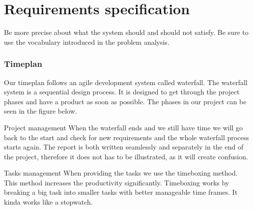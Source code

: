 \chapter{Requirements specification}

Be more precise about what the system should and should not satisfy.
Be sure to use the vocabulary introduced in the problem analysis.


\subsection{Timeplan}
Our timeplan follows an agile development system called waterfall.
The waterfall system is a sequential design process.
It is designed to get through the project phases and have a product as soon as
possible. The phases in our project can be seen in the figure below.

Project management
When the waterfall ends and we still have time
we will go back to the start and check for new requirements
and the whole waterfall process starts again.
The report is both written seamlessly and separately in the end of the project,
therefore it does not has to be illustrated, as it will create confusion.


Tasks management
When providing the tasks we use the timeboxing method.
This method increases the productivity significantly.
Timeboxing works by breaking a big task into smaller tasks with better manageable time frames.
It kinda works like a stopwatch.


